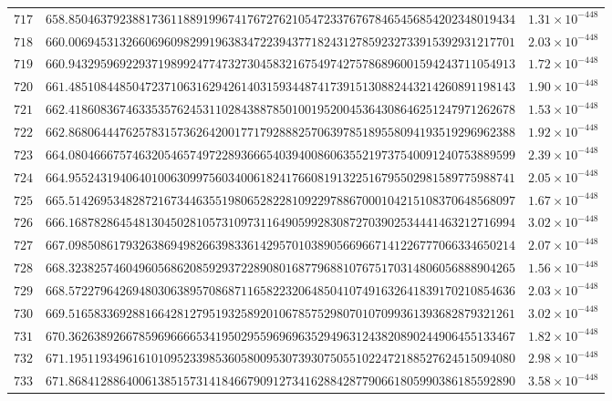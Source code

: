 \documentclass[12pt,reqno]{amsart}
\theoremstyle{remark}
\begin{document}
\begin{longtable}{clc}
$717$ & $658.8504637923881736118891996741767276210547233767678465456854202348019434$ & $1.31\times 10^{-448}$ \\
$718$ & $660.0069453132660696098299196383472239437718243127859232733915392931217701$ & $2.03\times 10^{-448}$ \\
$719$ & $660.9432959692293719899247747327304583216754974275786896001594243711054913$ & $1.72\times 10^{-448}$ \\
$720$ & $661.4851084485047237106316294261403159344874173915130882443214260891198143$ & $1.90\times 10^{-448}$ \\
$721$ & $662.4186083674633535762453110284388785010019520045364308646251247971262678$ & $1.53\times 10^{-448}$ \\
$722$ & $662.8680644476257831573626420017717928882570639785189558094193519296962388$ & $1.92\times 10^{-448}$ \\
$723$ & $664.0804666757463205465749722893666540394008606355219737540091240753889599$ & $2.39\times 10^{-448}$ \\
$724$ & $664.9552431940640100630997560340061824176608191322516795502981589775988741$ & $2.05\times 10^{-448}$ \\
$725$ & $665.5142695348287216734463551980652822810922978867000104215108370648568097$ & $1.67\times 10^{-448}$ \\
$726$ & $666.1687828645481304502810573109731164905992830872703902534441463212716994$ & $3.02\times 10^{-448}$ \\
$727$ & $667.0985086179326386949826639833614295701038905669667141226777066334650214$ & $2.07\times 10^{-448}$ \\
$728$ & $668.3238257460496056862085929372289080168779688107675170314806056888904265$ & $1.56\times 10^{-448}$ \\
$729$ & $668.5722796426948030638957086871165822320648504107491632641839170210854636$ & $2.03\times 10^{-448}$ \\
$730$ & $669.5165833692881664281279519325892010678575298070107099361393682879321261$ & $3.02\times 10^{-448}$ \\
$731$ & $670.3626389266785969666653419502955969696352949631243820890244906455133467$ & $1.82\times 10^{-448}$ \\
$732$ & $671.1951193496161010952339853605800953073930750551022472188527624515094080$ & $2.98\times 10^{-448}$ \\
$733$ & $671.8684128864006138515731418466790912734162884287790661805990386185592890$ & $3.58\times 10^{-448}$ \\

\end{longtable}
\end{document}
